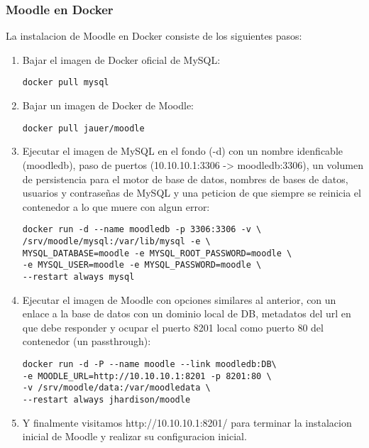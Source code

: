 \subsubsection{Moodle en Docker}
La instalacion de Moodle en Docker consiste de los siguientes pasos:
\begin{enumerate}
	\item Bajar el imagen de Docker oficial de MySQL:
    \begin{lstlisting}    
docker pull mysql
    \end{lstlisting}
    \item Bajar un imagen de Docker de Moodle:
    \begin{lstlisting}    
docker pull jauer/moodle
    \end{lstlisting}
    \item Ejecutar el imagen de MySQL en el fondo (-d) con un nombre idenficable (moodledb), paso de puertos (10.10.10.1:3306 -> moodledb:3306), un volumen de persistencia para el motor de base de datos, nombres de bases de datos, usuarios y contraseñas de MySQL y una peticion de que siempre se reinicia el contenedor a lo que muere con algun error:
    \begin{lstlisting}    
docker run -d --name moodledb -p 3306:3306 -v \
/srv/moodle/mysql:/var/lib/mysql -e \
MYSQL_DATABASE=moodle -e MYSQL_ROOT_PASSWORD=moodle \
-e MYSQL_USER=moodle -e MYSQL_PASSWORD=moodle \
--restart always mysql
    \end{lstlisting}
    \item Ejecutar el imagen de Moodle con opciones similares al anterior, con un enlace a la base de datos con un dominio local de DB, metadatos del url en que debe responder y ocupar el puerto 8201 local como puerto 80 del contenedor (un passthrough):
    \begin{lstlisting}    
docker run -d -P --name moodle --link moodledb:DB\
-e MOODLE_URL=http://10.10.10.1:8201 -p 8201:80 \
-v /srv/moodle/data:/var/moodledata \
--restart always jhardison/moodle
    \end{lstlisting}
    \item Y finalmente visitamos http://10.10.10.1:8201/ para terminar la instalacion inicial de Moodle y realizar su configuracion inicial.
\end{enumerate}

